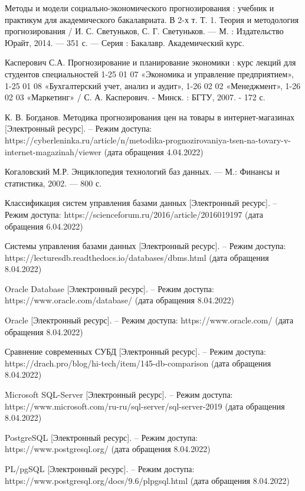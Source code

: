 \documentclass[a4paper,14pt]{extreport}
\begin{document}
\begin{thebibliography}{3}
	 Методы и модели социально-экономического прогнозирования : учебник и практикум для академического бакалавриата. В 2-х т. Т. 1. Теория и методология прогнозирования / И. С. Светуньков, С. Г. Светуньков. — М. : Издательство Юрайт, 2014. — 351 с. — Серия : Бакалавр. Академический курс.
	
	 Касперович С.А. Прогнозирование и планирование экономики : курс лекций для студентов специальностей 1-25 01 07 «Экономика и управление предприятием», 1-25 01 08 «Бухгалтерский учет, анализ и аудит», 1-26 02 02 «Менеджмент», 1-26 02 03 «Маркетинг» / С. А. Касперович. - Минск. : БГТУ, 2007. - 172 с. 
	
	 К. В. Богданов. Методика прогнозирования цен на товары в интернет-магазинах [Электронный ресурс]. -- Режим доступа: https://cyberleninka.ru/article/n/metodika-prognozirovaniya-tsen-na-tovary-v-internet-magazinah/viewer (дата обращения 4.04.2022)
	
	 Когаловский М.Р. Энциклопедия технологий баз данных. — М.: Финансы и статистика, 2002. — 800 с.
	
	 Классификация систем управления базами данных [Электронный ресурс]. -- Режим доступа: https://scienceforum.ru/2016/article/2016019197 (дата обращения 6.04.2022)
	
	 Системы управления базами данных [Электронный ресурс]. -- Режим доступа: https://lecturesdb.readthedocs.io/databases/dbms.html (дата обращения 8.04.2022)
	
	 Oracle Database [Электронный ресурс]. -- Режим доступа: https://www.oracle.com/database/ (дата обращения 8.04.2022)
	
	 Oracle [Электронный ресурс]. -- Режим доступа: https://www.oracle.com/ (дата обращения 8.04.2022)
	
	 Сравнение современных СУБД [Электронный ресурс]. -- Режим доступа:  https://drach.pro/blog/hi-tech/item/145-db-comparison (дата обращения 8.04.2022)
	
	 Microsoft SQL-Server  [Электронный ресурс]. -- Режим доступа:  https://www.microsoft.com/ru-ru/sql-server/sql-server-2019 (дата обращения 8.04.2022)
	
	 PostgreSQL [Электронный ресурс]. -- Режим доступа: https://www.postgresql.org/ (дата обращения 8.04.2022)
	
	 PL/pgSQL [Электронный ресурс]. -- Режим доступа: https://www.postgresql.org/docs/9.6/plpgsql.html (дата обращения 8.04.2022)
	

\end{thebibliography}
\end{document}
